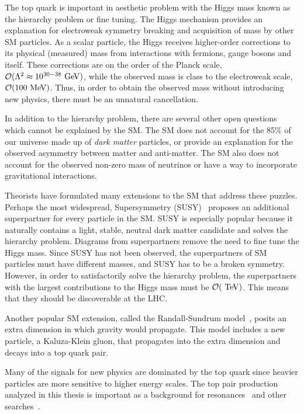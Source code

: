 The top quark is important in aesthetic problem with the Higgs mass known as the hierarchy problem or fine tuning. The Higgs mechanism provides an explanation for electroweak symmetry breaking and acquisition of mass by other SM particles. As a scalar particle, the Higgs receives higher-order corrections to its physical (measured) mass from interactions with fermions, gauge bosons and itself. These corrections are on the order of the Planck scale, $\mathcal{O}(\Lambda^2 \approx 10^{30-38} \gev)$, while the observed mass is class to the electroweak scale, $\mathcal{O}(100 \mev)$. Thus, in order to obtain the observed mass without introducing new physics, there must be an unnatural cancellation.

In addition to the hierarchy problem, there are several other open questions which cannot be explained by the SM. The SM does not account for the 85\% of our universe made up of \textit{dark matter} particles, or provide an explanation for the observed asymmetry between matter and anti-matter. The SM also does not account for the observed non-zero mass of neutrinos or have a way to incorporate gravitational interactions.

Theorists have formulated many extensions to the SM that address these puzzles. Perhaps the most widespread, Supersymmetry (SUSY)~\cite{susy} proposes an additional superpartner for every particle in the SM. SUSY is especially popular because it naturally contains a light, stable, neutral dark matter candidate and solves the hierarchy problem. Diagrams from superpartners remove the need to fine tune the Higgs mass. Since SUSY has not been observed, the superpartners of SM particles must have different masses, and SUSY has to be a broken symmetry. However, in order to satisfactorily solve the hierarchy problem, the superpartners with the largest contributions to the Higgs mass must be $\mathcal{O}(\tev)$. This means that they should be discoverable at the LHC.

Another popular SM extension, called the Randall-Sundrum model~\cite{Lillie:2007yh}, posits an extra dimension in which gravity would propagate. This model includes a new particle, a Kaluza-Klein gluon, that propagates into the extra dimension and decays into a top quark pair.

Many of the signals for new physics are dominated by the top quark since heavier particles are more sensitive to higher energy scales.  The top pair production analyzed in this thesis is important as a background for \ttbar resonances~\cite{ATLAS-CONF-2015-009} and other searches~\cite{Aad:2014kra}.



